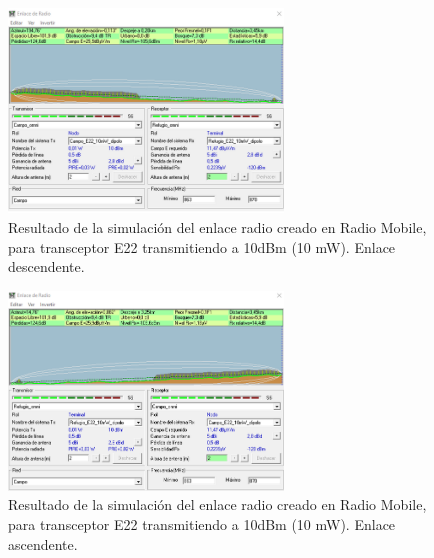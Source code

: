 \documentclass[12pt]{article}
\begin{document}
	\pagebreak
	
	\begin{figure}[h!]
		\begin{center}
			\includegraphics[width=0.65\textwidth]{img/resultado_e22_10mW_desc.png}
			\caption{Resultado de la simulación del enlace radio creado en Radio Mobile, para transceptor E22 transmitiendo a 10dBm (10 mW). Enlace descendente.}
			\label{fig: resultado enlace e22 10mW descendente radio mobile}
		\end{center}
	\end{figure}
	
	
	\begin{figure}[h!]
		\begin{center}
			\includegraphics[width=0.65\textwidth]{img/resultado_e22_10mW_asc.png}
			\caption{Resultado de la simulación del enlace radio creado en Radio Mobile, para transceptor E22 transmitiendo a 10dBm (10 mW). Enlace ascendente.}
			\label{fig: resultado enlace e22 10mW ascendente radio mobile}
		\end{center}
	\end{figure}
	
	\pagebreak
	
\end{document}
